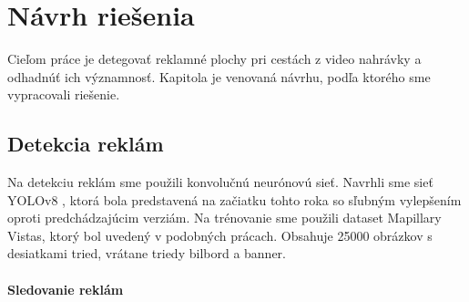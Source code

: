 \chapter{Návrh riešenia}\label{chap:proposal}

Cieľom práce je detegovať reklamné plochy pri cestách z video nahrávky a odhadnúť ich významnosť. Kapitola je venovaná návrhu, podľa ktorého sme vypracovali riešenie.  



\section{Detekcia reklám}

Na detekciu reklám sme použili konvolučnú neurónovú sieť. Navrhli sme sieť YOLOv8 \cite{yolov8}, ktorá bola predstavená na začiatku tohto roka so sľubným vylepšením oproti predchádzajúcim verziám. Na trénovanie sme použili dataset Mapillary Vistas, ktorý bol uvedený v podobných prácach. Obsahuje 25000 obrázkov s desiatkami tried, vrátane triedy bilbord a banner.



\subsubsection{Sledovanie reklám}


